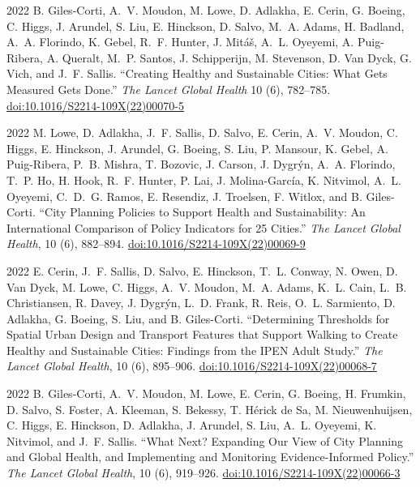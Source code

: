 \documentclass[11pt,letterpaper]{report}
\begin{document}
\begin{tablist}
        \item[2022] \tab{}B. Giles-Corti, A.~V. Moudon, M. Lowe, D. Adlakha, E. Cerin, G. Boeing, C. Higgs, J. Arundel, S. Liu, E. Hinckson, D. Salvo, M.~A. Adams, H. Badland, A.~A. Florindo, K. Gebel, R.~F. Hunter, J. Mitáš, A.~L. Oyeyemi, A. Puig-Ribera, A. Queralt, M.~P. Santos, J. Schipperijn, M. Stevenson, D. Van Dyck, G. Vich, and J.~F. Sallis. \enquote{Creating Healthy and Sustainable Cities: What Gets Measured Gets Done.} \textit{The Lancet Global Health} 10 (6), 782--785. \href{https://doi.org/10.1016/S2214-109X(22)00070-5}{doi:10.1016/S2214-109X(22)00070-5}

        \item[2022] \tab{}M. Lowe, D. Adlakha, J.~F. Sallis, D. Salvo, E. Cerin, A.~V. Moudon, C. Higgs, E. Hinckson, J. Arundel, G. Boeing, S. Liu, P. Mansour, K. Gebel, A. Puig-Ribera, P.~B. Mishra, T. Bozovic, J. Carson, J. Dygrýn, A.~A. Florindo, T.~P. Ho, H. Hook, R.~F. Hunter, P. Lai, J. Molina-García, K. Nitvimol, A.~L. Oyeyemi, C.~D.~G. Ramos, E. Resendiz, J. Troelsen, F. Witlox, and B. Giles-Corti. \enquote{City Planning Policies to Support Health and Sustainability: An International Comparison of Policy Indicators for 25 Cities.}  \textit{The Lancet Global Health}, 10 (6), 882--894. \href{https://doi.org/10.1016/S2214-109X(22)00069-9}{doi:10.1016/S2214-109X(22)00069-9}

        \item[2022] \tab{}E. Cerin, J.~F. Sallis, D. Salvo, E. Hinckson, T.~L. Conway, N. Owen, D. Van Dyck, M. Lowe, C. Higgs, A.~V. Moudon, M.~A. Adams, K.~L. Cain, L.~B. Christiansen, R. Davey, J. Dygrýn, L.~D. Frank, R. Reis, O.~L. Sarmiento, D. Adlakha, G. Boeing, S. Liu, and B. Giles-Corti. \enquote{Determining Thresholds for Spatial Urban Design and Transport Features that Support Walking to Create Healthy and Sustainable Cities: Findings from the IPEN Adult Study.}  \textit{The Lancet Global Health}, 10 (6), 895--906. \href{https://doi.org/10.1016/S2214-109X(22)00068-7}{doi:10.1016/S2214-109X(22)00068-7}

        \item[2022] \tab{}B. Giles-Corti, A.~V. Moudon, M. Lowe, E. Cerin, G. Boeing, H. Frumkin, D. Salvo, S. Foster, A. Kleeman, S. Bekessy, T. Hérick de Sa, M. Nieuwenhuijsen, C. Higgs, E. Hinckson, D. Adlakha, J. Arundel, S. Liu, A.~L. Oyeyemi, K. Nitvimol, and J.~F. Sallis. \enquote{What Next? Expanding Our View of City Planning and Global Health, and Implementing and Monitoring Evidence-Informed Policy.}  \textit{The Lancet Global Health}, 10 (6), 919--926. \href{https://doi.org/10.1016/S2214-109X(22)00066-3}{doi:10.1016/S2214-109X(22)00066-3}


\end{tablist}
\end{document}
